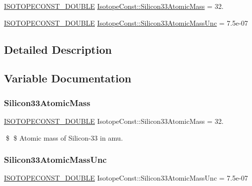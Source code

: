\begin{DoxyCompactItemize}
\item 
\mbox{\hyperlink{group___isotope_const-_macros_ga8f45a7272ce02c0b4c65c44636ed719a}{I\+S\+O\+T\+O\+P\+E\+C\+O\+N\+S\+T\+\_\+\+D\+O\+U\+B\+LE}} \mbox{\hyperlink{group___isotope_const-_silicon-_si33_ga07dd8954552388f78bf7d58765e40504}{Isotope\+Const\+::\+Silicon33\+Atomic\+Mass}} = 32.
\item 
\mbox{\hyperlink{group___isotope_const-_macros_ga8f45a7272ce02c0b4c65c44636ed719a}{I\+S\+O\+T\+O\+P\+E\+C\+O\+N\+S\+T\+\_\+\+D\+O\+U\+B\+LE}} \mbox{\hyperlink{group___isotope_const-_silicon-_si33_ga2300e029c9a0d1099e9eda9f3e73bd98}{Isotope\+Const\+::\+Silicon33\+Atomic\+Mass\+Unc}} = 7.\+5e-\/07
\end{DoxyCompactItemize}


\subsection{Detailed Description}


\subsection{Variable Documentation}
\mbox{\label{group___isotope_const-_silicon-_si33_ga07dd8954552388f78bf7d58765e40504}} 
\subsubsection{\texorpdfstring{Silicon33\+Atomic\+Mass}{Silicon33AtomicMass}}
{\footnotesize\ttfamily \mbox{\hyperlink{group___isotope_const-_macros_ga8f45a7272ce02c0b4c65c44636ed719a}{I\+S\+O\+T\+O\+P\+E\+C\+O\+N\+S\+T\+\_\+\+D\+O\+U\+B\+LE}} Isotope\+Const\+::\+Silicon33\+Atomic\+Mass = 32.}

\$ \$ Atomic mass of Silicon-\/33 in amu. \mbox{\label{group___isotope_const-_silicon-_si33_ga2300e029c9a0d1099e9eda9f3e73bd98}} 
\subsubsection{\texorpdfstring{Silicon33\+Atomic\+Mass\+Unc}{Silicon33AtomicMassUnc}}
{\footnotesize\ttfamily \mbox{\hyperlink{group___isotope_const-_macros_ga8f45a7272ce02c0b4c65c44636ed719a}{I\+S\+O\+T\+O\+P\+E\+C\+O\+N\+S\+T\+\_\+\+D\+O\+U\+B\+LE}} Isotope\+Const\+::\+Silicon33\+Atomic\+Mass\+Unc = 7.\+5e-\/07}

